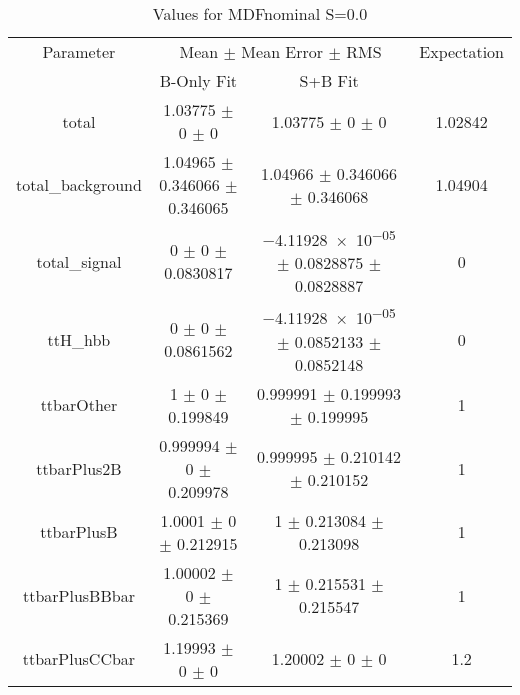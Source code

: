 \begin{table}
\centering
\caption{Values for MDFnominal S=0.0}
\begin{tabular}{cccc}
\toprule
Parameter & \multicolumn{2}{c}{Mean $\pm$ Mean Error $\pm$ RMS} & Expectation\\
 & B-Only Fit & S+B Fit & \\
\midrule
total & \num{1.03775} $\pm$ \num{0} $\pm$ \num{0} & \num{1.03775} $\pm$ \num{0} $\pm$ \num{0} & \num{1.02842}\\
total\_background & \num{1.04965} $\pm$ \num{0.346066} $\pm$ \num{0.346065} & \num{1.04966} $\pm$ \num{0.346066} $\pm$ \num{0.346068} & \num{1.04904}\\
total\_signal & \num{0} $\pm$ \num{0} $\pm$ \num{0.0830817} & \num{-4.11928e-05} $\pm$ \num{0.0828875} $\pm$ \num{0.0828887} & \num{0}\\
ttH\_hbb & \num{0} $\pm$ \num{0} $\pm$ \num{0.0861562} & \num{-4.11928e-05} $\pm$ \num{0.0852133} $\pm$ \num{0.0852148} & \num{0}\\
ttbarOther & \num{1} $\pm$ \num{0} $\pm$ \num{0.199849} & \num{0.999991} $\pm$ \num{0.199993} $\pm$ \num{0.199995} & \num{1}\\
ttbarPlus2B & \num{0.999994} $\pm$ \num{0} $\pm$ \num{0.209978} & \num{0.999995} $\pm$ \num{0.210142} $\pm$ \num{0.210152} & \num{1}\\
ttbarPlusB & \num{1.0001} $\pm$ \num{0} $\pm$ \num{0.212915} & \num{1} $\pm$ \num{0.213084} $\pm$ \num{0.213098} & \num{1}\\
ttbarPlusBBbar & \num{1.00002} $\pm$ \num{0} $\pm$ \num{0.215369} & \num{1} $\pm$ \num{0.215531} $\pm$ \num{0.215547} & \num{1}\\
ttbarPlusCCbar & \num{1.19993} $\pm$ \num{0} $\pm$ \num{0} & \num{1.20002} $\pm$ \num{0} $\pm$ \num{0} & \num{1.2}\\
\bottomrule
\end{tabular}
\end{table}